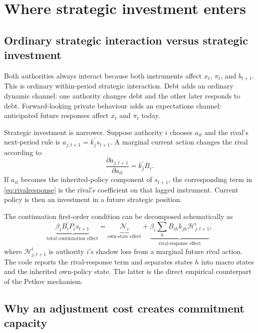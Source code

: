 \documentclass[11pt]{article}
\newcommand{\trans}{^{\prime}}
\begin{document}
\section{Where strategic investment enters}
\label{sec:investment}

\subsection{Ordinary strategic interaction versus strategic investment}

Both authorities always interact because both instruments affect $x_t$,
$\pi_t$, and $b_{t+1}$. This is ordinary within-period strategic interaction.
Debt adds an ordinary dynamic channel: one authority changes debt and the
other later responds to debt. Forward-looking private behaviour adds an
expectations channel: anticipated future responses affect $x_t$ and $\pi_t$
today.

Strategic investment is narrower. Suppose authority $i$ chooses $a_{it}$ and
the rival's next-period rule is $a_{j,t+1}=k_j\trans s_{t+1}$. A marginal
current action changes the rival according to
\begin{equation}
\frac{\partial a_{j,t+1}}{\partial a_{it}}
=k_j\trans B_i.                                           \label{eq:rivalresponse}
\end{equation}
If $a_{it}$ becomes the inherited-policy component of $s_{t+1}$, the
corresponding term in \eqref{eq:rivalresponse} is the rival's coefficient on
that lagged instrument. Current policy is then an investment in a future
strategic position.

The continuation first-order condition can be decomposed schematically as
\begin{equation}
\underbrace{\beta_i B_i\trans P_i s_{t+1}}_{
\text{total continuation effect}}
=\underbrace{\mathcal N_i}_{\text{own-state effect}}
 +\underbrace{\beta_i\sum_h B_{ih}k_{jh}\mathcal H^i_{j,t+1}}_{
\text{rival-response effect}},                            \label{eq:wedge}
\end{equation}
where $\mathcal H^i_{j,t+1}$ is authority $i$'s shadow loss from a marginal
future rival action. The code reports the rival-response term and separates
states $h$ into macro states and the inherited own-policy state. The latter is
the direct empirical counterpart of the Petkov mechanism.

\subsection{Why an adjustment cost creates commitment capacity}
\end{document}

